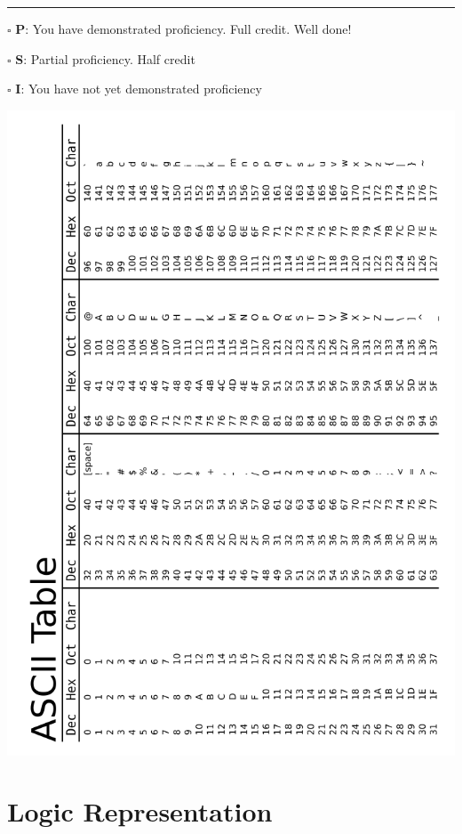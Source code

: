 \documentclass[12pt]{article}
\begin{document}
\vfill

\rule[1ex]{\textwidth}{.1pt}

$\square$ \textbf{P}: You have demonstrated proficiency. Full credit. Well done!

$\square$ \textbf{S}: Partial proficiency. Half credit

$\square$ \textbf{I}: You have not yet demonstrated proficiency

\newpage

\includegraphics[width=\textwidth]{wikimedia-ascii-table.png}

\newpage



\section*{Logic Representation}
\end{document}
